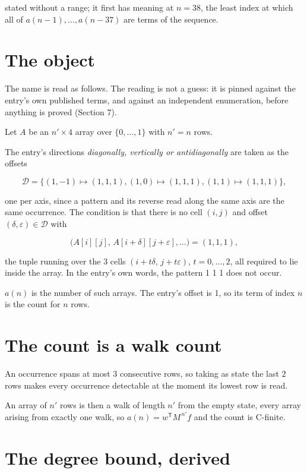 \documentclass[11pt]{article}
\theoremstyle{definition}
\begin{document}
stated without a range; it first has meaning at $n = 38$, the least index at which all of $a(n-1),\dots,a(n-37)$ are terms of the sequence.

\section{The object}

The name is read as follows. The reading is not a guess: it is pinned against the entry's own published terms, and against an independent enumeration, before anything is proved (Section 7).

Let $A$ be an $n' \times 4$ array over $\{0,\dots,1\}$ with $n' = n$ rows.

The entry's directions {\itshape diagonally, vertically or antidiagonally} are taken as the offsets

\[\mathcal{D} = \{(1,-1)\mapsto(1,1,1), (1,0)\mapsto(1,1,1), (1,1)\mapsto(1,1,1)\},\]

one per axis, since a pattern and its reverse read along the same axis are the same occurrence. The condition is that there is no cell $(i,j)$ and offset $(\delta,\varepsilon)\in\mathcal{D}$ with

\[\bigl(A[i][j],\,A[i{+}\delta][j{+}\varepsilon],\dots\bigr) = (1, 1, 1),\]

the tuple running over the $3$ cells $(i+t\delta,\,j+t\varepsilon)$, $t = 0,\dots,2$, all required to lie inside the array. In the entry's own words, the pattern 1 1 1 does not occur.

$a(n)$ is the number of such arrays. The entry's offset is 1, so its term of index $n$ is the count for $n$ rows.

\section{The count is a walk count}

An occurrence spans at most $3$ consecutive rows, so taking as state the last $2$ rows makes every occurrence detectable at the moment its lowest row is read.

An array of $n'$ rows is then a walk of length $n'$ from the empty state, every array arising from exactly one walk, so $a(n) = w^{\mathsf T}M^{\,n'}f$ and the count is C-finite.

\section{The degree bound, derived}
\end{document}
